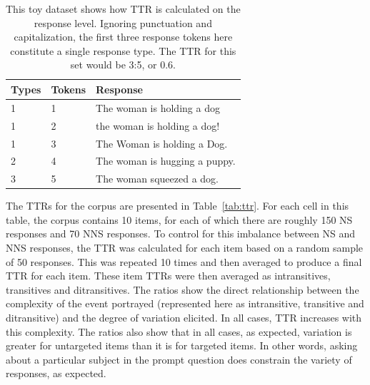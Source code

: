 \begin{table}[htb!]
\begin{center}
\begin{tabular}{|l|l|l|}
\hline
Types & Tokens & Response \\
\hline
1 & 1 & The woman is holding a dog \\
\hline
1 & 2 & the woman is holding a dog! \\
\hline
1 & 3 & The Woman is holding a Dog. \\
\hline
2 & 4 & The woman is hugging a puppy. \\
\hline
3 & 5 & The woman squeezed a dog. \\
\hline
\end{tabular}
\caption{\label{tab:type-token-examples} This toy dataset shows how TTR is calculated on the response level. Ignoring punctuation and capitalization, the first three response tokens here constitute a single response type. The TTR for this set would be 3:5, or 0.6.}
\end{center}
\end{table}


The TTRs for the corpus are presented in Table~\ref{tab:ttr}. 
For each cell in this table, the corpus contains 10 items, for each of which there are roughly 150 NS responses and 70 NNS responses. 
To control for this imbalance between NS and NNS responses, the TTR was calculated for each item based on a random sample of 50 responses.  This was repeated 10 times and then averaged to produce a final TTR for each item. These item TTRs were then averaged as intransitives, transitives and ditransitives. The ratios show the direct relationship between the complexity of the event portrayed (represented here as intransitive, transitive and ditransitive) and the degree of variation elicited. In all cases, TTR increases with this complexity.
The ratios also show that in all cases, as expected, variation is greater for untargeted items than it is for targeted items. In other words, asking about a particular subject in the prompt question does constrain the variety of responses, as expected.

